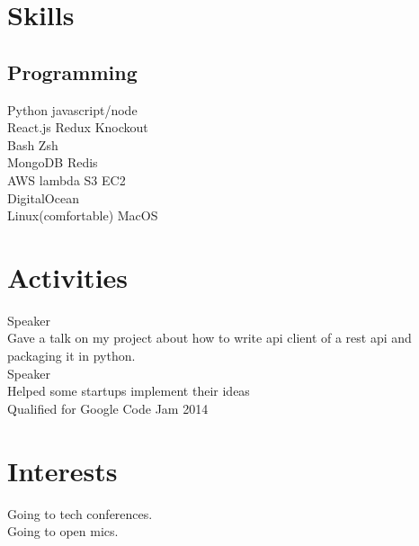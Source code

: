 \documentclass[]{deedy-resume-openfont}
\begin{document}
\begin{minipage}[t]{0.33\textwidth}




\section{Skills}
\subsection{Programming}
\textbullet{} Python \textbullet{} javascript/node \\
\textbullet{} React.js \textbullet{} Redux \textbullet{} Knockout \\
\textbullet{} Bash \textbullet{} Zsh \\
\textbullet{} MongoDB \textbullet{} Redis \\
\textbullet{} AWS lambda \textbullet{} S3 \textbullet{} EC2 \\
\textbullet{} DigitalOcean \\
\textbullet{} Linux(comfortable) \textbullet{} MacOS \\
\sectionsep

%
%

\section{Activities}
\textbullet{} Speaker \\
\textbullet{} Gave a talk on my project about how to write api client of a rest api and packaging it in python. \\
\textbullet{} Speaker \\
\textbullet{} Helped some startups implement their ideas \\
\textbullet{} Qualified for Google Code Jam 2014  \\
\sectionsep
%
%

\section{Interests}
\textbullet{} Going to tech conferences. \\
\textbullet{} Going to open mics. \\

%
%

\end{minipage}
\end{document}
